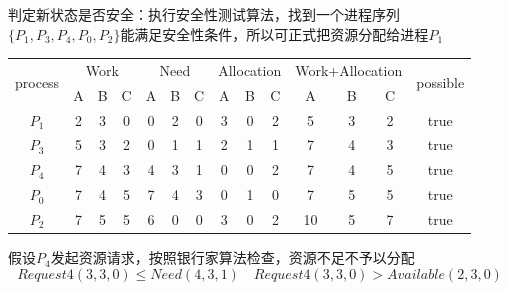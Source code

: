 \documentclass[cs4size,a4paper,10pt]{ctexart}
\begin{document}
	判定新状态是否安全：执行安全性测试算法，找到一个进程序列$\{P_1,P_3,P_4,P_0,P_2\}$能满足安全性条件，所以可正式把资源分配给进程$P_1$
	\begin{table}[H]
	\centering
	\begin{tabular}{c|ccc|ccc|ccc|ccc|c}
	\hline
	\multirow{2}{*}{process} & \multicolumn{3}{c|}{Work} & \multicolumn{3}{c|}{Need} & \multicolumn{3}{c|}{Allocation} & \multicolumn{3}{c|}{Work+Allocation} & \multirow{2}{*}{possible} \\ \cline{2-13}
							 & A       & B      & C      & A       & B      & C      & A         & B        & C        & A           & B          & C         &                           \\ \hline
	$P_1$                    & 2       & 3      & 0      & 0       & 2      & 0      & 3         & 0        & 2        & 5           & 3          & 2         & true                      \\ \hline
	$P_3$                    & 5       & 3      & 2      & 0       & 1      & 1      & 2         & 1        & 1        & 7           & 4          & 3         & true                      \\ \hline
	$P_4$                    & 7       & 4      & 3      & 4       & 3      & 1      & 0         & 0        & 2        & 7           & 4          & 5         & true                      \\ \hline
	$P_0$                    & 7       & 4      & 5      & 7       & 4      & 3      & 0         & 1        & 0        & 7           & 5          & 5         & true                      \\ \hline
	$P_2$                    & 7       & 5      & 5      & 6       & 0      & 0      & 3         & 0        & 2        & 10          & 5          & 7         & true                      \\ \hline
	\end{tabular}
	\end{table}

	假设$P_4$发起资源请求，按照银行家算法检查，资源不足不予以分配
	$$Request4(3, 3, 0) \leq Need(4, 3, 1) \quad Request4(3, 3, 0) > Available(2, 3, 0)$$
\end{document}

